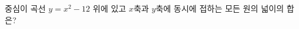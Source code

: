 중심이 곡선 $y=x^2-12$ 위에 있고 $x$축과 $y$축에 동시에 접하는 모든 원의 넓이의 합은?
\dmchoicesauto{}{$46\pi$}{$48\pi$}{$50\pi$}{$52\pi$}{$54\pi$}
